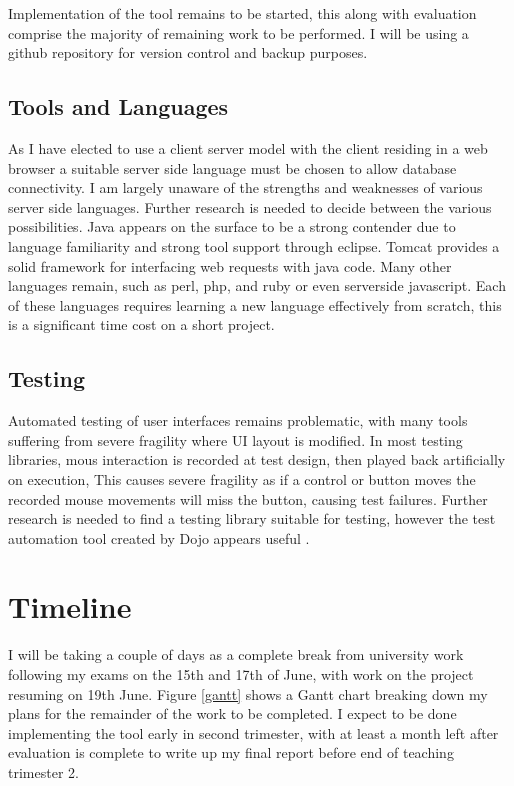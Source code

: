Implementation of the tool remains to be started, this along with evaluation comprise the majority of remaining work to be performed.
I will be using a github repository for version control and backup purposes.

\subsection{Tools and Languages}\label{tools}

As I have elected to use a client server model with the client residing in a web browser a suitable server side language must be chosen to allow database connectivity. I am largely unaware of the strengths and weaknesses of various server side languages. Further research is needed to decide between the various possibilities. Java appears on the surface to be a strong contender due to language familiarity and strong tool support through eclipse. Tomcat provides a solid framework for interfacing web requests with java code.
Many other languages remain, such as perl, php, and ruby or even serverside javascript. Each of these languages requires learning a new language effectively from scratch, this is a significant time cost on a short project. 

\subsection{Testing}
Automated testing of user interfaces remains problematic, with many tools suffering from severe fragility where UI layout is modified. In most testing libraries, mous interaction is recorded at test design, then played back artificially on execution, This causes severe fragility as if a control or button moves the recorded mouse movements will miss the button, causing test failures. Further research is needed to find a testing library suitable for testing, however the test automation tool created by Dojo appears useful \cite{dojo2013test}.

\section{Timeline}

I will be taking a couple of days as a complete break from university work following my exams on the 15th and 17th of June, with work on the project resuming on 19th June. Figure \ref{gantt} shows a Gantt chart breaking down my plans for the remainder of the work to be completed.  I expect to be done implementing the tool early in second trimester, with at least a month left after evaluation is complete to write up my final report before end of teaching trimester 2.
  
